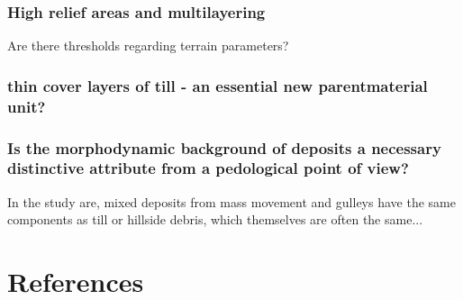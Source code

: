 \documentclass[preprint,12pt,authoryear]{elsarticle}
\begin{document}
\subsubsection{High relief areas and multilayering}
Are there thresholds regarding terrain parameters?
\subsubsection{thin cover layers of till - an essential new parentmaterial unit?}

\subsubsection{Is the morphodynamic background of deposits a necessary distinctive attribute from a pedological point of view?}
In the study are, mixed deposits from mass movement and gulleys have the same components as till or hillside debris, which themselves are often the same...


\section*{References}

\end{document}
